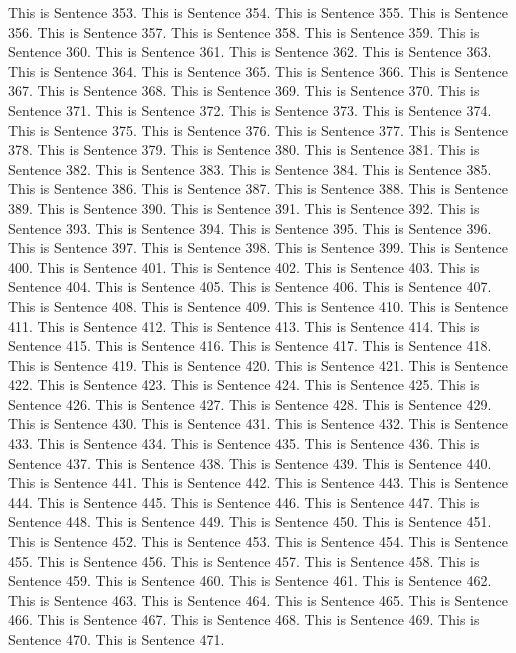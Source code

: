 \documentclass{article}
\begin{document}
This is Sentence 353.
This is Sentence 354.
This is Sentence 355.
This is Sentence 356.
This is Sentence 357.
This is Sentence 358.
This is Sentence 359.
This is Sentence 360.
This is Sentence 361.
This is Sentence 362.
This is Sentence 363.
This is Sentence 364.
This is Sentence 365.
This is Sentence 366.
This is Sentence 367.
This is Sentence 368.
This is Sentence 369.
This is Sentence 370.
This is Sentence 371.
This is Sentence 372.
This is Sentence 373.
This is Sentence 374.
This is Sentence 375.
This is Sentence 376.
This is Sentence 377.
This is Sentence 378.
This is Sentence 379.
This is Sentence 380.
This is Sentence 381.
This is Sentence 382.
This is Sentence 383.
This is Sentence 384.
This is Sentence 385.
This is Sentence 386.
This is Sentence 387.
This is Sentence 388.
This is Sentence 389.
This is Sentence 390.
This is Sentence 391.
This is Sentence 392.
This is Sentence 393.
This is Sentence 394.
This is Sentence 395.
This is Sentence 396.
This is Sentence 397.
This is Sentence 398.
This is Sentence 399.
This is Sentence 400.
This is Sentence 401.
This is Sentence 402.
This is Sentence 403.
This is Sentence 404.
This is Sentence 405.
This is Sentence 406.
This is Sentence 407.
This is Sentence 408.
This is Sentence 409.
This is Sentence 410.
This is Sentence 411.
This is Sentence 412.
This is Sentence 413.
This is Sentence 414.
This is Sentence 415.
This is Sentence 416.
This is Sentence 417.
This is Sentence 418.
This is Sentence 419.
This is Sentence 420.
This is Sentence 421.
This is Sentence 422.
This is Sentence 423.
This is Sentence 424.
This is Sentence 425.
This is Sentence 426.
This is Sentence 427.
This is Sentence 428.
This is Sentence 429.
This is Sentence 430.
This is Sentence 431.
This is Sentence 432.
This is Sentence 433.
This is Sentence 434.
This is Sentence 435.
This is Sentence 436.
This is Sentence 437.
This is Sentence 438.
This is Sentence 439.
This is Sentence 440.
This is Sentence 441.
This is Sentence 442.
This is Sentence 443.
This is Sentence 444.
This is Sentence 445.
This is Sentence 446.
This is Sentence 447.
This is Sentence 448.
This is Sentence 449.
This is Sentence 450.
This is Sentence 451.
This is Sentence 452.
This is Sentence 453.
This is Sentence 454.
This is Sentence 455.
This is Sentence 456.
This is Sentence 457.
This is Sentence 458.
This is Sentence 459.
This is Sentence 460.
This is Sentence 461.
This is Sentence 462.
This is Sentence 463.
This is Sentence 464.
This is Sentence 465.
This is Sentence 466.
This is Sentence 467.
This is Sentence 468.
This is Sentence 469.
This is Sentence 470.
This is Sentence 471.
\end{document}
